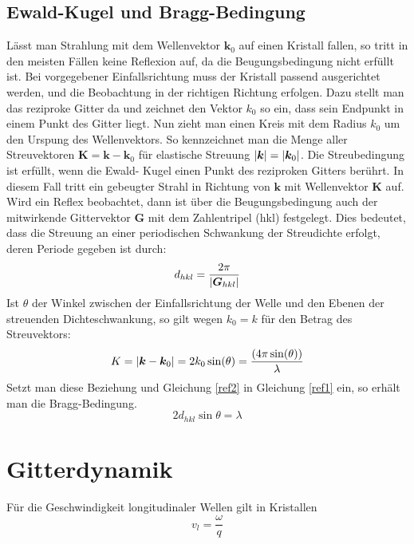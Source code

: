 \documentclass[11pt]{article}
\DeclarePairedDelimiter\abs{\lvert}{\rvert}
\begin{document}
\subsection{Ewald-Kugel und Bragg-Bedingung}
Lässt man Strahlung mit dem Wellenvektor $\bm{k}_0$ auf einen Kristall fallen,
so tritt in den meisten Fällen keine Reflexion auf, da die Beugungsbedingung
nicht erfüllt ist. Bei vorgegebener Einfallsrichtung muss der Kristall passend
ausgerichtet werden, und die Beobachtung in der richtigen Richtung erfolgen.
Dazu stellt man das reziproke Gitter da und zeichnet den Vektor $k_0$ so ein,
dass sein Endpunkt in einem Punkt des Gitter liegt. Nun zieht man einen Kreis
mit dem Radius $k_0$ um den Urspung des Wellenvektors. So kennzeichnet man die
Menge aller Streuvektoren $\bm{K}=\bm{k}-\bm{k}_0$ für elastische Streuung
$\abs{\bm{k}}=\abs{\bm{k}_0}$. Die Streubedingung ist erfüllt, wenn die Ewald-
Kugel einen Punkt des reziproken Gitters berührt. In diesem Fall tritt ein
gebeugter Strahl in Richtung von $\bm{k}$ mit Wellenvektor $\bm{K}$ auf.
Wird ein Reflex beobachtet, dann ist über die Beugungsbedingung auch der
mitwirkende Gittervektor $\bm{G}$ mit dem Zahlentripel (hkl) festgelegt. Dies
bedeutet, dass die Streuung an einer periodischen Schwankung der Streudichte
erfolgt, deren Periode gegeben ist durch:
\begin{equation} \label{ref2}
  d_{hkl}=\frac{2\pi}{\abs{\bm{G}_{hkl}}}
\end{equation}
Ist $\theta$ der Winkel zwischen der Einfallsrichtung der Welle und den Ebenen
der streuenden Dichteschwankung, so gilt wegen $k_0=k$ für den Betrag des
Streuvektors:
\begin{equation}
  K = \abs{\bm{k}-\bm{k}_0}=2k_0\sin(\theta)=\frac{(4\pi\sin(\theta))}
  {\lambda}
\end{equation}
Setzt man diese Beziehung und Gleichung \ref{ref2} in Gleichung \ref{ref1} ein,
so erhält man die Bragg-Bedingung.
\begin{equation}
  2d_{hkl}\sin{\theta}=\lambda
\end{equation}
\section{Gitterdynamik}
Für die Geschwindigkeit longitudinaler Wellen gilt in Kristallen
\begin{equation}
  v_l=\frac{\omega}{q}
\end{equation}
\end{document}
